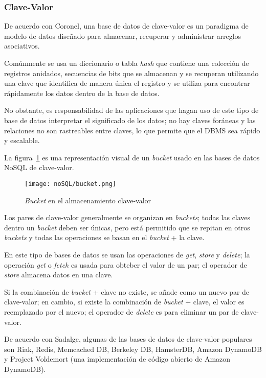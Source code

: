 \subsubsection{Clave-Valor}
De acuerdo con Coronel\cite{coronel_database_nodate}, una base de datos de clave-valor es un paradigma de modelo de datos diseñado para almacenar, recuperar y administrar arreglos asociativos.


Comúnmente se usa un diccionario o tabla \textit{hash} que contiene una colección de registros anidados, secuencias de bits que se almacenan y se recuperan utilizando una clave que identifica de manera única el registro y se utiliza para encontrar rápidamente los datos dentro de la base de datos.


No obstante, es responsabilidad de las aplicaciones que hagan uso de este tipo de base de datos interpretar el significado de los datos; no hay claves foráneas y las relaciones no son rastreables entre claves, lo que permite que el DBMS sea rápido y escalable.


La figura~\ref{img:claveValor-bucket} es una representación visual de un \textit{bucket} usado en las bases de datos NoSQL de clave-valor.

\begin{figure}[H]
    \centering
    \texttt{[image: noSQL/bucket.png]}
    \caption{\textit{Bucket} en el almacenamiento clave-valor}
    \label{img:claveValor-bucket}
\end{figure} 


Los pares de clave-valor generalmente se organizan en \textit{buckets}; todas las claves dentro un \textit{bucket} deben ser únicas, pero está permitido que se repitan en otros \textit{buckets} y todas las operaciones se basan en el \textit{bucket} + la clave.


En este tipo de bases de datos se usan las operaciones de \textit{get}, \textit{store} y \textit{delete}; la operación \textit{get} o \textit{fetch} es usada para obteber el valor de un par; el operador de \textit{store} almacena datos en una clave. 


Si la combinación de \textit{bucket} + clave no existe, se añade como un nuevo par de clave-valor; en cambio, si existe la combinación de \textit{bucket} + clave, el valor es reemplazado por el nuevo; el operador de \textit{delete} es para eliminar un par de clave-valor.


De acuerdo con Sadalge\cite{sadalage_nosql_nodate}, algunas de las bases de datos de clave-valor populares son Riak, Redis, Memcached DB, Berkeley DB, HamsterDB, Amazon DynamoDB y Project Voldemort (una implementación de código abierto de Amazon DynamoDB).


